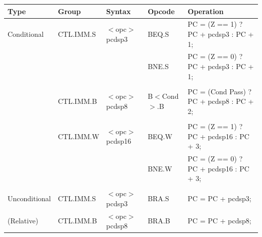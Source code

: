 \begin{table}
\begin{subtable}{\linewidth}
\begin{center}
\scriptsize
\begin{tabular}{lllll}
\hline
Type               & Group             & Syntax                                & Opcode            & Operation                                                                     \\ \hline
Conditional        & CTL.IMM.S         & $<$opc$>$ pcdsp3                      & BEQ.S             & PC = (Z == 1) ? PC + pcdsp3 : PC + 1;                                         \\
                   &                   &                                       & BNE.S             & PC = (Z == 0) ? PC + pcdsp3 : PC + 1;                                         \\
                   &                   &                                       &                   &                                                                               \\
                   & CTL.IMM.B         & $<$opc$>$ pcdsp8                      & B$<$Cond$>$.B     & PC = (Cond Pass) ? PC + pcdsp8 : PC + 2;                                      \\
                   &                   &                                       &                   &                                                                               \\
                   & CTL.IMM.W         & $<$opc$>$ pcdsp16                     & BEQ.W             & PC = (Z == 1) ? PC + pcdsp16 : PC + 3;                                        \\
                   &                   &                                       & BNE.W             & PC = (Z == 0) ? PC + pcdsp16 : PC + 3;                                        \\
                   &                   &                                       &                   &                                                                               \\
Unconditional      & CTL.IMM.S         & $<$opc$>$ pcdsp3                      & BRA.S             & PC = PC + pcdsp3;                                                             \\
(Relative)         & CTL.IMM.B         & $<$opc$>$ pcdsp8                      & BRA.B             & PC = PC + pcdsp8;                                                             \\

\end{tabular}
\end{center}
\end{subtable}
\end{table}
